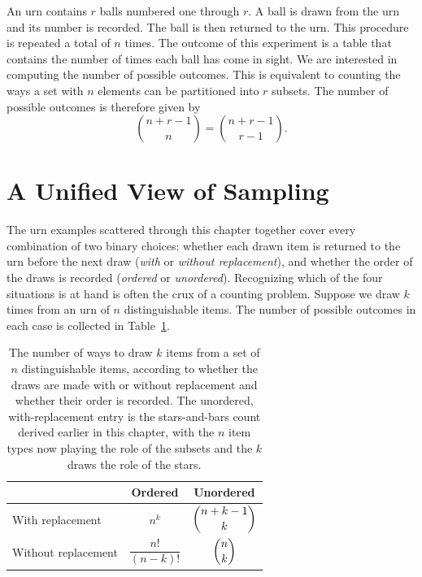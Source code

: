 \begin{example}
An urn contains $r$ balls numbered one through $r$.
A ball is drawn from the urn and its number is recorded.
The ball is then returned to the urn.
This procedure is repeated a total of $n$ times.
The outcome of this experiment is a table that contains the number of times each ball has come in sight.
We are interested in computing the number of possible outcomes.
This is equivalent to counting the ways a set with $n$ elements can be partitioned into $r$ subsets.
The number of possible outcomes is therefore given by
\begin{equation*}
\binom{n + r - 1}{n} = \binom{n + r - 1}{r - 1} .
\end{equation*}
\end{example}


\section{A Unified View of Sampling}

The urn examples scattered through this chapter together cover every combination of two binary choices: whether each drawn item is returned to the urn before the next draw (\emph{with} or \emph{without replacement}), and whether the order of the draws is recorded (\emph{ordered} or \emph{unordered}).
Recognizing which of the four situations is at hand is often the crux of a counting problem.
Suppose we draw $k$ times from an urn of $n$ distinguishable items.
The number of possible outcomes in each case is collected in Table~\ref{table:Sampling}.

\begin{table}[htb!]
\begin{center}
\setlength{\tabcolsep}{14pt}
\begin{tabular}{l c c}
\toprule
& Ordered & Unordered \\
\midrule
With replacement & $n^k$ & $\dbinom{n + k - 1}{k}$ \\
\addlinespace
Without replacement & $\dfrac{n!}{(n-k)!}$ & $\dbinom{n}{k}$ \\
\bottomrule
\end{tabular}
\end{center}
\caption{The number of ways to draw $k$ items from a set of $n$ distinguishable items, according to whether the draws are made with or without replacement and whether their order is recorded.
The unordered, with-replacement entry is the stars-and-bars count derived earlier in this chapter, with the $n$ item types now playing the role of the subsets and the $k$ draws the role of the stars.}
\label{table:Sampling}
\end{table}

